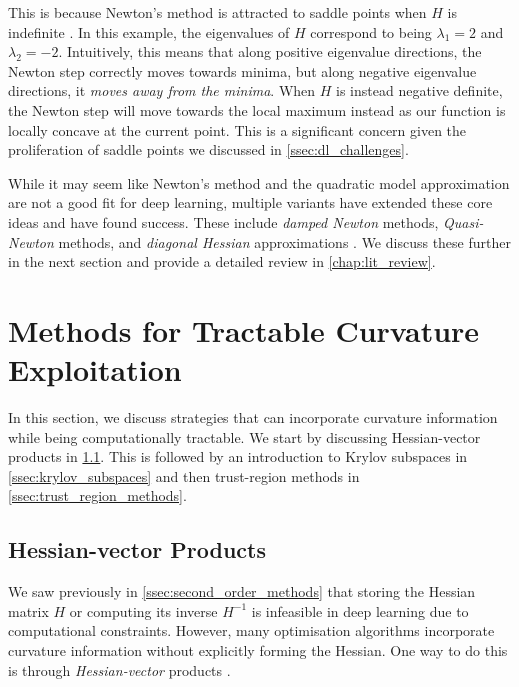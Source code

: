 This is because Newton's method is attracted to saddle points when $H$ is indefinite \citep{dauphin2014sfn}. In this example, the eigenvalues of $H$ correspond to being $\lambda_1 = 2$ and $\lambda_2 = -2$. Intuitively, this means that along positive eigenvalue directions, the Newton step correctly moves towards minima, but along negative eigenvalue directions, it \textit{moves away from the minima}. When $H$ is instead negative definite, the Newton step will move towards the local maximum instead as our function is locally concave at the current point. This is a significant concern given the proliferation of saddle points we discussed in \cref{ssec:dl_challenges}. 

While it may seem like Newton's method and the quadratic model approximation are not a good fit for deep learning, multiple variants have extended these core ideas and have found success. These include \textit{damped Newton} methods, \textit{Quasi-Newton} methods, and \textit{diagonal Hessian} approximations \citep{NoceWrig06, liu2023sophia}. We discuss these further in the next section and provide a detailed review in \cref{chap:lit_review}.

\section{Methods for Tractable Curvature Exploitation}
\label{sec:tractable_curvature_exploitation}

In this section, we discuss strategies that can incorporate curvature information while being computationally tractable. We start by discussing Hessian-vector products in \cref{ssec:hessian_vector_products}. This is followed by an introduction to Krylov subspaces in \cref{ssec:krylov_subspaces} and then trust-region methods in \cref{ssec:trust_region_methods}.

\subsection{Hessian-vector Products}
\label{ssec:hessian_vector_products}

We saw previously in \cref{ssec:second_order_methods} that storing the Hessian matrix $H$ or computing its inverse $H^{-1}$ is infeasible in deep learning due to computational constraints. However, many optimisation algorithms incorporate curvature information without explicitly forming the Hessian. One way to do this is through \textit{Hessian-vector} products \citep{pearlmutter1994fast,bloghvp}.

